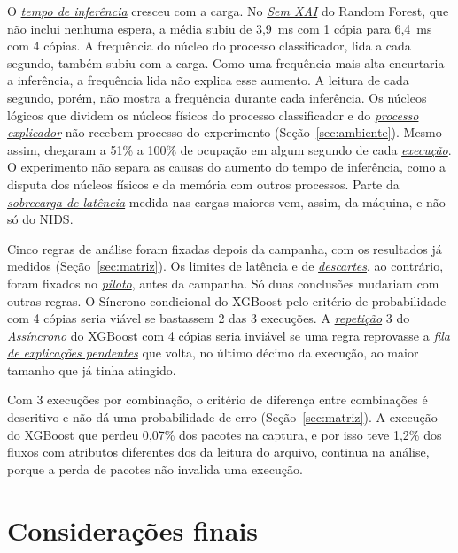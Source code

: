 \documentclass[
  12pt,
  oneside,
  a4paper,
  chapter=TITLE,
  sumario=tradicional,
  english,
  brazil
]{abntex2}
\newcommand{\termo}[2]{\hyperref[gl:#1]{\emph{#2}}}
\begin{document}
O \termo{tempo-inferencia}{tempo de inferência} cresceu com a carga. No \termo{sem-xai}{Sem XAI}
do Random Forest, que não inclui nenhuma espera, a média subiu de 3,9~ms com 1 cópia para 6,4~ms
com 4 cópias. A frequência do núcleo do processo classificador, lida a cada segundo, também subiu
com a carga. Como uma frequência mais alta encurtaria a inferência, a frequência lida não explica
esse aumento. A leitura de cada segundo, porém, não mostra a frequência durante cada inferência. Os
núcleos lógicos que dividem os núcleos físicos do processo classificador e do
\termo{processo-explicador}{processo explicador} não recebem processo do experimento
(Seção~\ref{sec:ambiente}). Mesmo assim, chegaram a 51\% a 100\% de ocupação em algum segundo de
cada \termo{execucao}{execução}. O experimento não separa as causas do aumento do tempo de
inferência, como a disputa dos núcleos físicos e da memória com outros processos. Parte da
\termo{sobrecarga}{sobrecarga de latência} medida nas cargas maiores vem, assim, da máquina, e não
só do NIDS.

Cinco regras de análise foram fixadas depois da campanha, com os resultados já medidos
(Seção~\ref{sec:matriz}). Os limites de latência e de \termo{descarte}{descartes}, ao contrário,
foram fixados no \termo{piloto}{piloto}, antes da campanha. Só duas conclusões mudariam com outras
regras. O Síncrono condicional do XGBoost pelo critério de
probabilidade com 4 cópias seria viável se bastassem 2 das 3 execuções. A
\termo{repeticao}{repetição} 3 do \termo{assincrono}{Assíncrono} do XGBoost com 4 cópias seria
inviável se uma regra reprovasse a \termo{fila-explicacoes}{fila de explicações pendentes} que
volta, no último décimo da execução, ao maior tamanho que já tinha atingido.

Com 3 execuções por combinação, o critério de diferença entre combinações é descritivo e não dá
uma probabilidade de erro (Seção~\ref{sec:matriz}). A execução do XGBoost que perdeu 0,07\% dos
pacotes na captura, e por isso teve 1,2\% dos fluxos com atributos diferentes dos da leitura do
arquivo, continua na análise, porque a perda de pacotes não invalida uma execução.

\chapter{Considerações finais}
\label{cap:conclusao}
\end{document}
